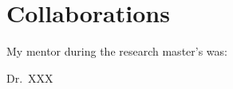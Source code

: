 \chapter{Collaborations}

\vfill
\begin{center}
\begin{minipage}{.7\linewidth}

My mentor during the research master's was:


Dr.\ XXX

\end{minipage}
\end{center}
\vfill